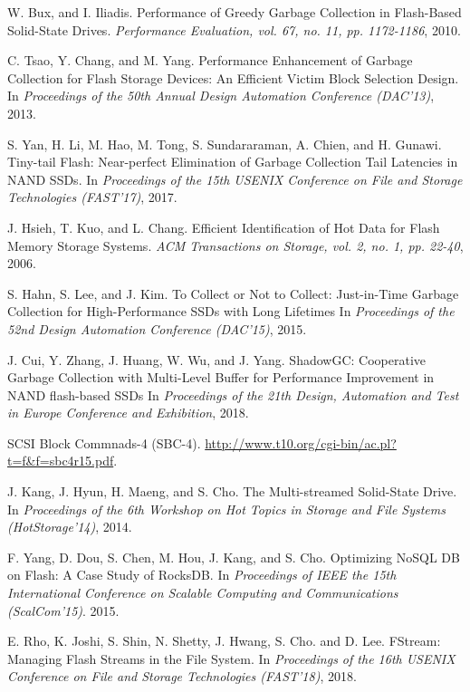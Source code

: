 \newpage


\begin{thebibliography}{00}

W. Bux, and I. Iliadis.
Performance of Greedy Garbage Collection in Flash-Based Solid-State Drives.
\textit{Performance Evaluation, vol. 67, no. 11, pp. 1172-1186}, 2010.

C. Tsao, Y. Chang, and M. Yang.
Performance Enhancement of Garbage Collection for Flash Storage Devices: 
An Efficient Victim Block Selection Design.
In \textit{Proceedings of the 50th Annual Design Automation Conference (DAC'13)}, 2013.

S. Yan, H. Li, M. Hao, M. Tong, S. Sundararaman, A. Chien, and H. Gunawi.
Tiny-tail Flash: Near-perfect Elimination of Garbage Collection Tail Latencies in NAND SSDs.
In \textit{Proceedings of the 15th USENIX Conference on File and Storage Technologies (FAST'17)}, 2017.

J. Hsieh, T. Kuo, and L. Chang.
Efficient Identification of Hot Data for Flash Memory Storage Systems.
\textit{ACM Transactions on Storage, vol. 2, no. 1, pp. 22-40}, 2006.

S. Hahn, S. Lee, and J. Kim.
To Collect or Not to Collect: Just-in-Time Garbage Collection for High-Performance SSDs with Long Lifetimes
In \textit{Proceedings of the 52nd Design Automation Conference (DAC'15)}, 2015.

J. Cui, Y. Zhang, J. Huang, W. Wu, and J. Yang.
ShadowGC: Cooperative Garbage Collection with Multi-Level Buffer for Performance Improvement 
in NAND flash-based SSDs
In \textit{Proceedings of the 21th Design, Automation and Test in Europe Conference and Exhibition}, 2018.

SCSI Block Commnads-4 (SBC-4).
\url{http://www.t10.org/cgi-bin/ac.pl?t=f&f=sbc4r15.pdf}.

J. Kang, J. Hyun, H. Maeng, and S. Cho. 
The Multi-streamed Solid-State Drive.
In \textit{Proceedings of the 6th Workshop on Hot Topics in Storage and File Systems (HotStorage'14)}, 2014.

F. Yang, D. Dou, S. Chen, M. Hou, J. Kang, and S. Cho.
Optimizing NoSQL DB on Flash: A Case Study of RocksDB.
In \textit{Proceedings of IEEE the 15th International Conference on Scalable Computing
and Communications (ScalCom'15)}. 2015.

E. Rho, K. Joshi, S. Shin, N. Shetty, J. Hwang, S. Cho. and D. Lee. 
FStream: Managing Flash Streams in the File System.
In \textit{Proceedings of the 16th USENIX Conference on File and Storage Technologies (FAST'18)}, 2018.


\end{thebibliography}
